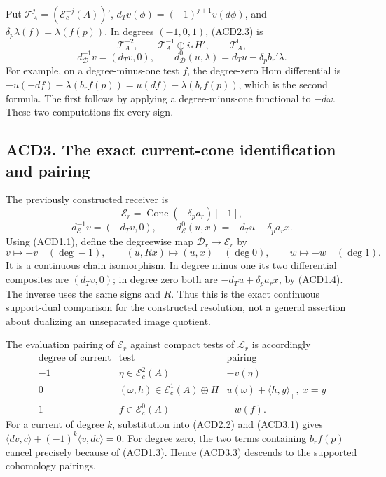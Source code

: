Put \(\mathscr T_A^j=(\mathscr E_c^{-j}(A))'\),
\(d_Tv(\phi)=(-1)^{j+1}v(d\phi)\), and
\(\delta_p\lambda(f)=\lambda(f(p))\). In degrees \((-1,0,1)\), (ACD2.3)
is \[
\mathscr T_A^{-2},\qquad \mathscr T_A^{-1}\oplus i_*H',\qquad
\mathscr T_A^0,
\] \[
d^{-1}_{\mathscr D}v=(d_Tv,0),\qquad
d^0_{\mathscr D}(u,\lambda)=d_Tu-\delta_pb_r'\lambda.
\tag{ACD2.4}
\] For example, on a degree-minus-one test \(f\), the degree-zero Hom
differential is \(-u(-df)-\lambda(b_rf(p))=u(df)-\lambda(b_rf(p))\),
which is the second formula. The first follows by applying a
degree-minus-one functional to \(-d\omega\). These two computations fix
every sign.

\subsection{ACD3. The exact current-cone identification and
pairing}\label{acd3.-the-exact-current-cone-identification-and-pairing}

The previously constructed receiver is \[
\mathscr E_r=\operatorname{Cone}(-\delta_pa_r)[-1],
\] \[
d^{-1}_{\mathscr E}v=(-d_Tv,0),\qquad
d^0_{\mathscr E}(u,x)=-d_Tu+\delta_pa_rx.
\tag{ACD3.1}
\] Using (ACD1.1), define the degreewise map
\(\mathscr D_r\to\mathscr E_r\) by \[
v\mapsto-v\quad(\deg-1),\qquad
(u,Rx)\mapsto(u,x)\quad(\deg0),\qquad
w\mapsto-w\quad(\deg1).
\tag{ACD3.2}
\] It is a continuous chain isomorphism. In degree minus one its two
differential composites are \((d_Tv,0)\); in degree zero both are
\(-d_Tu+\delta_pa_rx\), by (ACD1.4). The inverse uses the same signs and
\(R\). Thus this is the exact continuous support-dual comparison for the
constructed resolution, not a general assertion about dualizing an
unseparated image quotient.

The evaluation pairing of \(\mathscr E_r\) against compact tests of
\(\mathscr L_r\) is accordingly \[
\begin{array}{c|c|c}
\text{degree of current}&\text{test}&\text{pairing}\\\hline
-1&\eta\in\mathscr E_c^2(A)&-v(\eta)\\
0&(\omega,h)\in\mathscr E_c^1(A)\oplus H&u(\omega)+\langle h,y\rangle_+,\ x=\overline y\\
1&f\in\mathscr E_c^0(A)&-w(f).
\end{array}
\tag{ACD3.3}
\] For a current of degree \(k\), substitution into (ACD2.2) and
(ACD3.1) gives \(\langle dv,c\rangle+(-1)^k\langle v,dc\rangle=0\). For
degree zero, the two terms containing \(b_rf(p)\) cancel precisely
because of (ACD1.3). Hence (ACD3.3) descends to the supported cohomology
pairings.

